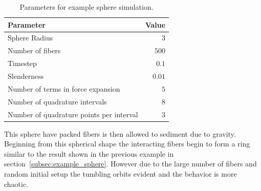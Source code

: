 \documentclass[a4paper,11pt]{kth-mag}
\begin{document}
\begin{table}[!htbp]
  \begin{center}
    \begin{tabulary}{0.7\textwidth}{LR}
      \toprule
      Parameter & Value \\
      \midrule
      Sphere Radius & $3$ \\
      Number of fibers & $500$ \\
      Timestep & $0.1$ \\
      Slenderness & $0.01$ \\
      Number of terms in force expansion & $5$ \\
      Number of quadrature intervals & $8$ \\
      Number of quadrature points per interval & $3$ \\
      \bottomrule
    \end{tabulary}
  \end{center}
  \caption{Parameters for example sphere simulation.}
  \label{tab:example_sphere}
\end{table}

This sphere have packed fibers is then allowed to sediment due to gravity. Beginning from this spherical shape the interacting fibers begin to form a ring similar to the result shown in the previous example in section~\ref{subsec:example_sphere}. However due to the large number of fibers and random initial setup the tumbling orbits evident and the behavior is more chaotic.
\end{document}
